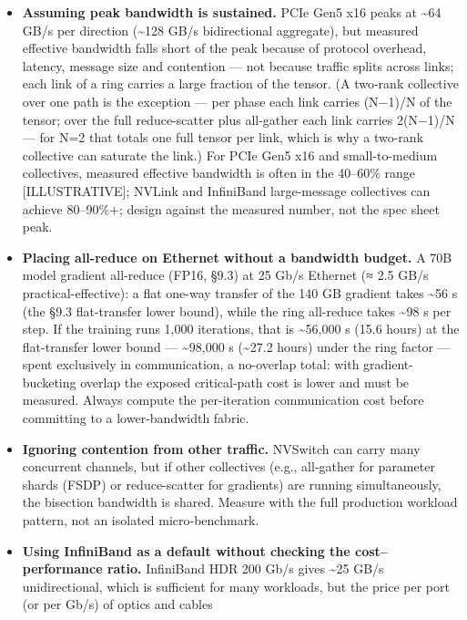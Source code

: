 \begin{itemize}
\item
  \textbf{Assuming peak bandwidth is sustained.} PCIe Gen5 x16 peaks at
  \textasciitilde64 GB/s per direction (\textasciitilde128 GB/s
  bidirectional aggregate), but measured effective bandwidth falls short
  of the peak because of protocol overhead, latency, message size and
  contention --- not because traffic splits across links; each link of a
  ring carries a large fraction of the tensor. (A two‑rank collective
  over one path is the exception --- per phase each link carries (N−1)/N
  of the tensor; over the full reduce-scatter plus all-gather each link
  carries 2(N−1)/N --- for N=2 that totals one full tensor per link,
  which is why a two-rank collective can saturate the link.) For PCIe
  Gen5 x16 and small-to-medium collectives, measured effective bandwidth
  is often in the 40--60\% range \mbox{{[}ILLUSTRATIVE{]}}; NVLink and
  InfiniBand large-message collectives can achieve 80--90\%+; design
  against the measured number, not the spec sheet peak.
\item
  \textbf{Placing all-reduce on Ethernet without a bandwidth budget.} A
  70B model gradient all-reduce (FP16, §9.3) at 25 Gb/s Ethernet (≈ 2.5
  GB/s practical-effective): a flat one-way transfer of the 140 GB
  gradient takes \textasciitilde56 s (the §9.3 flat-transfer lower
  bound), while the ring all-reduce takes \textasciitilde98 s per step.
  If the training runs 1,000 iterations, that is \textasciitilde56,000 s
  (15.6 hours) at the flat-transfer lower bound ---
  \textasciitilde98,000 s (\textasciitilde27.2 hours) under the ring
  factor --- spent exclusively in communication, a no-overlap total:
  with gradient-bucketing overlap the exposed critical-path cost is
  lower and must be measured. Always compute the per-iteration
  communication cost before committing to a lower-bandwidth fabric.
\item
  \textbf{Ignoring contention from other traffic.} NVSwitch can carry
  many concurrent channels, but if other collectives (e.g., all-gather
  for parameter shards (FSDP) or reduce-scatter for gradients) are
  running simultaneously, the bisection bandwidth is shared. Measure
  with the full production workload pattern, not an isolated
  micro‑benchmark.
\item
  \textbf{Using InfiniBand as a default without checking the
  cost--performance ratio.} InfiniBand HDR 200 Gb/s gives
  \textasciitilde25 GB/s unidirectional, which is sufficient for many
  workloads, but the price per port (or per Gb/s) of optics and cables

\end{itemize}

